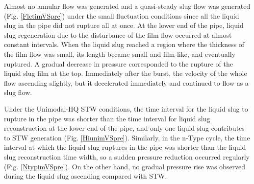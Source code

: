 \documentclass[aps,pre,preprint,groupedaddress,showkeys]{revtex4-2}
\begin{document}
Almost no annular flow was generated and a quasi-steady slug flow was generated (Fig. \ref{FlctimVSpre}) under the small fluctuation conditions since all the liquid slug in the pipe did not rupture all at once.
At the lower end of the pipe, liquid slug regeneration due to the disturbance of the film flow occurred at almost constant intervals. 
When the liquid slug reached a region where the thickness of the film flow was small, its length became small and film-like, and eventually ruptured.
A gradual decrease in pressure corresponded to the rupture of the liquid slug film at the top.
Immediately after the burst, the velocity of the whole flow ascending slightly, but it decelerated immediately and continued to flow as a slug flow.

Under the Unimodal-HQ STW conditions, the time interval for the liquid slug to rupture in the pipe was shorter than the time interval for liquid slug reconstruction at the lower end of the pipe, and only one liquid slug contributes to STW generation (Fig. \ref{HiunimVSpre}).
Similarly, in the n-Type cycle, the time interval at which the liquid slug ruptures in the pipe was shorter than the liquid slug reconstruction time width, so a sudden pressure reduction occurred regularly (Fig. \ref{NtypimVSpre}).
On the other hand, no gradual pressure rise was observed during the liquid slug ascending compared with STW.
\end{document}
